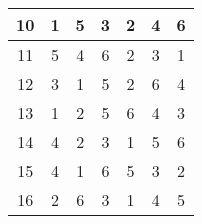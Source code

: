 \begin{table}[]
\begin{tabular}{|c|c|c|c|c|c|c|}
    10                                                       & 1                                                 & 5                                                 & 3                                                 & 2                                                 & 4                                                 & 6                                                 \\ \hline
    11                                                       & 5                                                 & 4                                                 & 6                                                 & 2                                                 & 3                                                 & 1                                                 \\ \hline
    12                                                       & 3                                                 & 1                                                 & 5                                                 & 2                                                 & 6                                                 & 4                                                 \\ \hline
    13                                                       & 1                                                 & 2                                                 & 5                                                 & 6                                                 & 4                                                 & 3                                                 \\ \hline
    14                                                       & 4                                                 & 2                                                 & 3                                                 & 1                                                 & 5                                                 & 6                                                 \\ \hline
    15                                                       & 4                                                 & 1                                                 & 6                                                 & 5                                                 & 3                                                 & 2                                                 \\ \hline
    16                                                       & 2                                                 & 6                                                 & 3                                                 & 1                                                 & 4                                                 & 5                                                 \\ \hline

\end{tabular}
\end{table}
